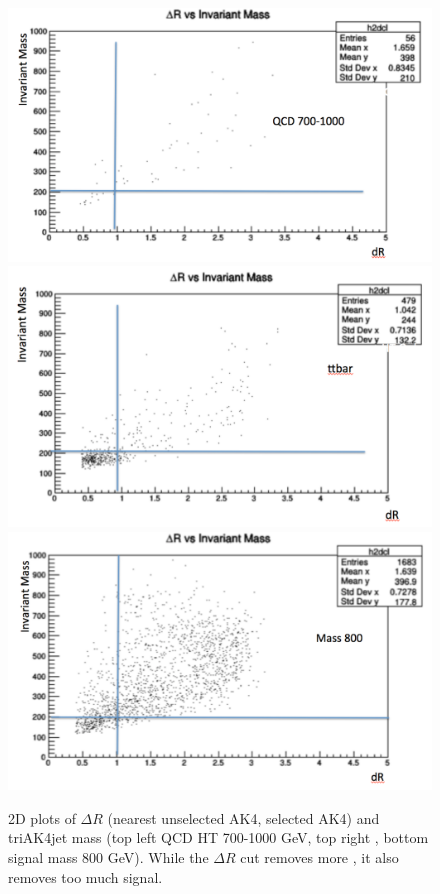 \begin{figure}[thb!]
\begin{center}
\includegraphics[scale=0.34]{Figures/2dqcd.pdf}
\includegraphics[scale=0.34]{Figures/2dttbar.pdf}\\
\includegraphics[scale=0.34]{Figures/2dsig.pdf}
\end{center}
\caption{2D plots of $\Delta R$ (nearest unselected AK4, selected AK4) and triAK4jet mass (top left QCD HT 700-1000 GeV, top right \ttbar, bottom signal mass 800 GeV). While the $\Delta R$ cut removes more \ttbar, it also removes too much signal.}
\label{fig:2D}
\end{figure} 

